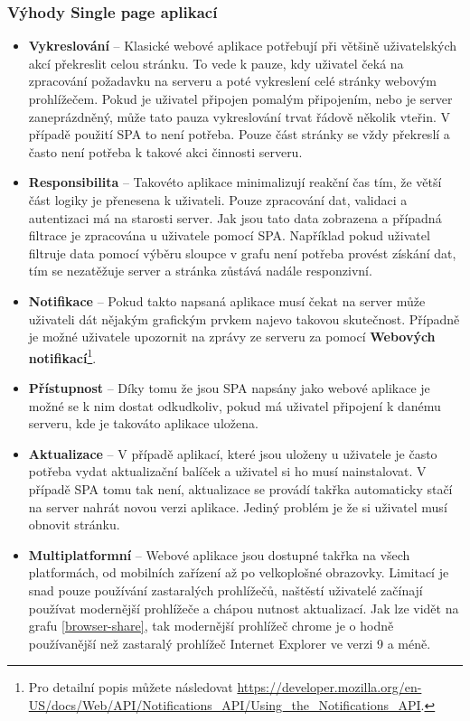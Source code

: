 \subsubsection{Výhody Single page aplikací}
\begin{itemize}
\item \textbf{Vykreslování} -- Klasické webové aplikace potřebují při většině uživatelských akcí překreslit celou stránku. To vede k pauze, kdy uživatel čeká na zpracování požadavku na serveru a poté vykreslení celé stránky webovým prohlížečem. Pokud je uživatel připojen pomalým připojením, nebo je server zaneprázdněný, může tato pauza vykreslování trvat řádově několik vteřin. V případě použití SPA to není potřeba. Pouze část stránky se vždy překreslí a často není potřeba k takové akci činnosti serveru.
\item \textbf{Responsibilita} -- Takovéto aplikace minimalizují reakční čas tím, že větší část logiky je přenesena k uživateli. Pouze zpracování dat, validaci a autentizaci má na starosti server. Jak jsou tato data zobrazena a případná filtrace je zpracována u uživatele pomocí SPA. Například pokud uživatel filtruje data pomocí výběru sloupce v grafu není potřeba provést získání dat, tím se nezatěžuje server a stránka zůstává nadále responzivní.
\item \textbf{Notifikace} -- Pokud takto napsaná aplikace musí čekat na server může uživateli dát nějakým grafickým prvkem najevo takovou skutečnost. Případně je možné uživatele upozornit na zprávy ze serveru za pomocí \textbf{Webových notifikací}\footnote{Pro detailní popis můžete následovat \url{https://developer.mozilla.org/en-US/docs/Web/API/Notifications_API/Using_the_Notifications_API}.}.
\item \textbf{Přístupnost} -- Díky tomu že jsou SPA napsány jako webové aplikace je možné se k nim dostat odkudkoliv, pokud má uživatel připojení k danému serveru, kde je takováto aplikace uložena.
\item \textbf{Aktualizace} -- V případě aplikací, které jsou uloženy u uživatele je často potřeba vydat aktualizační balíček a uživatel si ho musí nainstalovat. V případě SPA tomu tak není, aktualizace se provádí takřka automaticky stačí na server nahrát novou verzi aplikace. Jediný problém je že si uživatel musí obnovit stránku.
\item \textbf{Multiplatformní} -- Webové aplikace jsou dostupné takřka na všech platformách, od mobilních zařízení až po velkoplošné obrazovky. Limitací je snad pouze používání zastaralých prohlížečů, naštěstí uživatelé začínají používat modernější prohlížeče a chápou nutnost aktualizací. Jak lze vidět na grafu \ref{browser-share}, tak modernější prohlížeč chrome je o hodně používanější než zastaralý prohlížeč Internet Explorer ve verzi 9 a méně. \cite{SPA}
\end{itemize}
